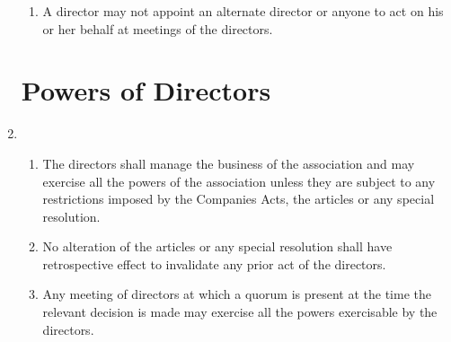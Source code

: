 \begin{enumerate}
\begin{enumerate}
  \item
    A director may not appoint an alternate director or anyone to act
    on his or her behalf at meetings of the directors.
  \end{enumerate}

\section{Powers of Directors}

\item
  \begin{enumerate}
  \item
    The directors shall manage the business of the association and may
    exercise all the powers of the association unless they are subject to
    any restrictions imposed by the Companies Acts, the articles or any
    special resolution.
  \item
    No alteration of the articles or any special resolution shall have
    retrospective effect to invalidate any prior act of the directors.
  \item
    Any meeting of directors at which a quorum is present at the time
    the relevant decision is made may exercise all the powers
    exercisable by the directors.
  \end{enumerate}


\end{enumerate}
